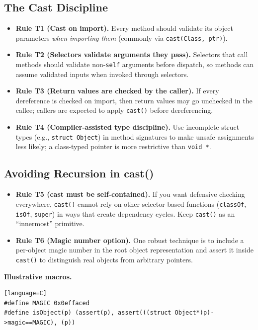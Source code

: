 \documentclass[11pt]{article}
\begin{document}
\subsection{The Cast Discipline}

\begin{itemize}
  \item \textbf{Rule T1 (Cast on import).} Every method should validate its object parameters \emph{when importing them} (commonly via \texttt{cast(Class, ptr)}).
  \item \textbf{Rule T2 (Selectors validate arguments they pass).} Selectors that call methods should validate non-\texttt{self} arguments before dispatch, so methods can assume validated inputs when invoked through selectors.
  \item \textbf{Rule T3 (Return values are checked by the caller).} If every dereference is checked on import, then return values may go unchecked in the callee; callers are expected to apply \texttt{cast()} before dereferencing.
  \item \textbf{Rule T4 (Compiler-assisted type discipline).} Use incomplete struct types (e.g., \texttt{struct Object}) in method signatures to make unsafe assignments less likely; a class-typed pointer is more restrictive than \texttt{void *}.
\end{itemize}

\subsection{Avoiding Recursion in cast()}

\begin{itemize}
  \item \textbf{Rule T5 (cast must be self-contained).} If you want defensive checking everywhere, \texttt{cast()} cannot rely on other selector-based functions (\texttt{classOf}, \texttt{isOf}, \texttt{super}) in ways that create dependency cycles. Keep \texttt{cast()} as an ``innermost'' primitive.
  \item \textbf{Rule T6 (Magic number option).} One robust technique is to include a per-object magic number in the root object representation and assert it inside \texttt{cast()} to distinguish real objects from arbitrary pointers.
\end{itemize}

\noindent\textbf{Illustrative macros.}
\begin{verbatim}[language=C]
#define MAGIC 0x0effaced
#define isObject(p) (assert(p), assert(((struct Object*)p)->magic==MAGIC), (p))
\end{verbatim}
\end{document}
